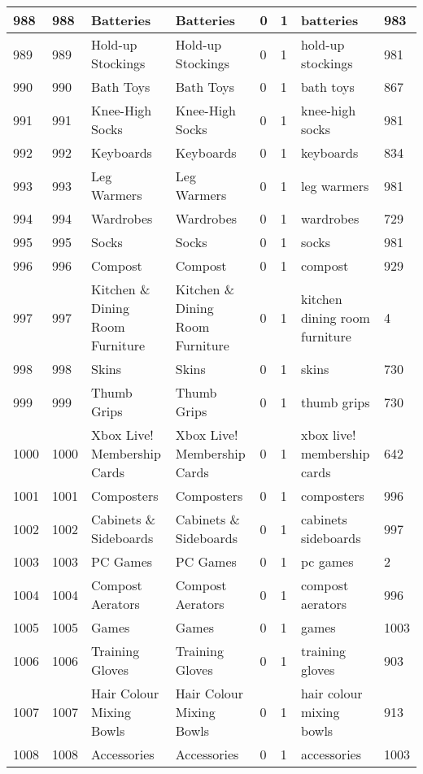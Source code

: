 \begin{longtable}{|l|l|l|l|l|l|l|l|}
988 & 988 & Batteries & Batteries & 0 & 1 & batteries & 983 \\ \hline 
989 & 989 & Hold-up Stockings & Hold-up Stockings & 0 & 1 & hold-up stockings & 981 \\ \hline 
990 & 990 & Bath Toys & Bath Toys & 0 & 1 & bath toys & 867 \\ \hline 
991 & 991 & Knee-High Socks & Knee-High Socks & 0 & 1 & knee-high socks & 981 \\ \hline 
992 & 992 & Keyboards & Keyboards & 0 & 1 & keyboards & 834 \\ \hline 
993 & 993 & Leg Warmers & Leg Warmers & 0 & 1 & leg warmers & 981 \\ \hline 
994 & 994 & Wardrobes & Wardrobes & 0 & 1 & wardrobes & 729 \\ \hline 
995 & 995 & Socks & Socks & 0 & 1 & socks & 981 \\ \hline 
996 & 996 & Compost & Compost & 0 & 1 & compost & 929 \\ \hline 
997 & 997 & Kitchen \& Dining Room Furniture & Kitchen \& Dining Room Furniture & 0 & 1 & kitchen dining room furniture & 4 \\ \hline 
998 & 998 & Skins & Skins & 0 & 1 & skins & 730 \\ \hline 
999 & 999 & Thumb Grips & Thumb Grips & 0 & 1 & thumb grips & 730 \\ \hline 
1000 & 1000 & Xbox Live! Membership Cards & Xbox Live! Membership Cards & 0 & 1 & xbox live! membership cards & 642 \\ \hline 
1001 & 1001 & Composters & Composters & 0 & 1 & composters & 996 \\ \hline 
1002 & 1002 & Cabinets \& Sideboards & Cabinets \& Sideboards & 0 & 1 & cabinets sideboards & 997 \\ \hline 
1003 & 1003 & PC Games & PC Games & 0 & 1 & pc games & 2 \\ \hline 
1004 & 1004 & Compost Aerators & Compost Aerators & 0 & 1 & compost aerators & 996 \\ \hline 
1005 & 1005 & Games & Games & 0 & 1 & games & 1003 \\ \hline 
1006 & 1006 & Training Gloves & Training Gloves & 0 & 1 & training gloves & 903 \\ \hline 
1007 & 1007 & Hair Colour Mixing Bowls & Hair Colour Mixing Bowls & 0 & 1 & hair colour mixing bowls & 913 \\ \hline 
1008 & 1008 & Accessories & Accessories & 0 & 1 & accessories & 1003 \\ \hline 

\end{longtable}
